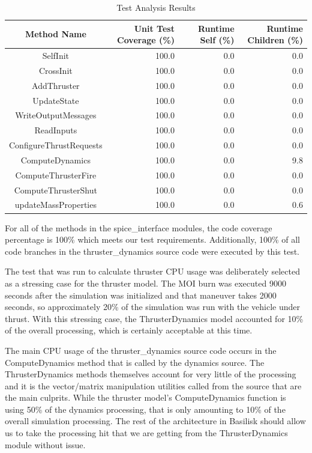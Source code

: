 \documentclass[]{LASPreport}
\begin{document}
{\begin{table}[htbp]
    \caption{Test Analysis Results}
   \label{tab:cov_met}
        \centering \fontsize{10}{10}\selectfont
   \begin{tabular}{c | r | r | r} %
      \hline
      Method Name    & Unit Test Coverage (\%) & Runtime Self (\%) & Runtime Children (\%) \\
      \hline
      SelfInit & 100.0 & 0.0 & 0.0 \\
      CrossInit & 100.0 & 0.0 & 0.0 \\
      AddThruster & 100.0 & 0.0 & 0.0 \\
      UpdateState & 100.0 & 0.0 & 0.0 \\
      WriteOutputMessages & 100.0 & 0.0 & 0.0 \\
      ReadInputs & 100.0 & 0.0 & 0.0 \\
      ConfigureThrustRequests & 100.0 & 0.0 & 0.0 \\
      ComputeDynamics & 100.0 & 0.0 & 9.8 \\
      ComputeThrusterFire & 100.0 & 0.0 & 0.0 \\
      ComputeThrusterShut & 100.0 & 0.0 & 0.0 \\
      updateMassProperties & 100.0 & 0.0 & 0.6 \\
      \hline
   \end{tabular}
\end{table}

For all of the methods in the spice\_interface modules, the code coverage 
percentage is 100\% which meets our test requirements.  Additionally, 100\% of 
all code branches in the thruster\_dynamics source code were executed by this 
test.

The test that was run to calculate thruster CPU usage was deliberately selected as 
a stressing case for the thruster model.  The MOI burn was executed 9000 seconds 
after the simulation was initialized and that maneuver takes 2000 seconds, so 
approximately 20\% of the simulation was run with the vehicle under thrust.  
With this stressing case, the ThrusterDynamics model accounted for 10\% of the 
overall processing, which is certainly acceptable at this time.

The main CPU usage of the thruster\_dynamics source code occurs in the 
ComputeDynamics method that is called by the dynamics source.  The 
ThrusterDynamics methods themselves account for very little of the processing 
and it is the vector/matrix manipulation utilities called from the source that 
are the main culprits.  While the thruster model's ComputeDynamics function is 
using 50\% of the dynamics processing, that is only amounting to 10\% of the 
overall simulation processing.  The rest of the architecture in Basilisk should 
allow us to take the processing hit that we are getting from the 
ThrusterDynamics module without issue.

}
\end{document}
